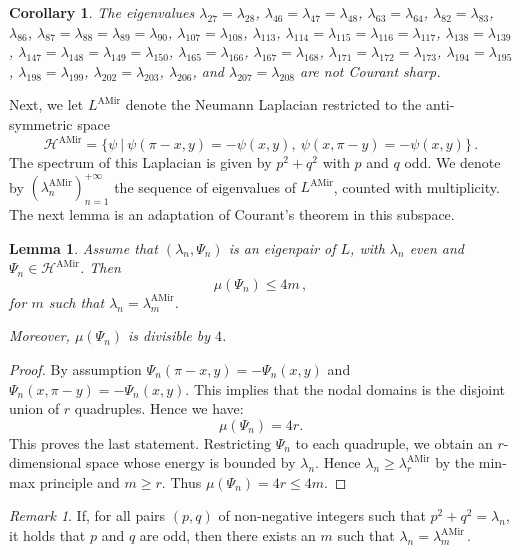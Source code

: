 \documentclass[a4paper,reqno,11pt]{amsart}
\newtheorem{lemma}[thm]{Lemma}
\newtheorem{cor}[thm]{Corollary}
\theoremstyle{remark}
\newtheorem{remark}[thm]{Remark}
\theoremstyle{definition}
\numberwithin{equation}{section}
\begin{document}
\begin{cor}
\label{cor:symmetric}
The eigenvalues 
$\lambda_{27}=\lambda_{28}$, 
$\lambda_{46}=\lambda_{47}=\lambda_{48}$, 
$\lambda_{63}=\lambda_{64}$, 
$\lambda_{82}=\lambda_{83}$, 
$\lambda_{86}$, 
$\lambda_{87}=\lambda_{88}=\lambda_{89}=\lambda_{90}$, 
$\lambda_{107}=\lambda_{108}$, 
$\lambda_{113}$, 
$\lambda_{114}=\lambda_{115}=\lambda_{116}=\lambda_{117}$, 
$\lambda_{138}=\lambda_{139}$, 
$\lambda_{147}=\lambda_{148}=\lambda_{149}=\lambda_{150}$, 
$\lambda_{165}=\lambda_{166}$, 
$\lambda_{167}=\lambda_{168}$, 
$\lambda_{171}=\lambda_{172}=\lambda_{173}$, 
$\lambda_{194}=\lambda_{195}$, 
$\lambda_{198}=\lambda_{199}$, 
$\lambda_{202}=\lambda_{203}$, 
$\lambda_{206}$, and 
$\lambda_{207}=\lambda_{208}$
are not Courant sharp.
\end{cor}

Next, we let $L^{\text{AMir}}$ denote the Neumann Laplacian restricted to the 
anti-symmetric space 
\[
\mathcal H^{\text{AMir}} = \{\psi~|~\psi(\pi-x,y)=-\psi(x,y),\ \psi(x,\pi-y)=-\psi(x,y)\}\,.
\]
The spectrum of this Laplacian is given by $p^2 + q^2$ with $p$ and $q$ odd. 
We denote by $(\lambda_n^{\text{AMir}})_{n=1}^{+\infty}$ the sequence of 
eigenvalues of $L^{\text{AMir}}$, counted with multiplicity. The next lemma is 
an adaptation of Courant's theorem in this subspace.

\begin{lemma}
\label{lem:antimirror}
Assume that $(\lambda_n,\Psi_n)$ is an eigenpair of $L$, with $\lambda_n$ even and  $\Psi_n \in \mathcal H^{\text{AMir}} $. 
Then
\[
\mu(\Psi_n) \leq 4 m\,,
\]
for $m$ such that  $\lambda_n=\lambda_m^{\text{AMir}}$.

Moreover, $\mu(\Psi_n)$ is divisible by $4$.
\end{lemma}

\begin{proof}
By assumption $\Psi_n(\pi-x,y)=-\Psi_n(x,y)$ and 
$\Psi_n(x,\pi-y)=-\Psi_n(x,y)$. This implies that the nodal domains is the 
disjoint union of $r$ quadruples. Hence we have:
\[
\mu(\Psi_n) = 4 r.
\]
This proves the last statement. Restricting $\Psi_n$ to each quadruple, we 
obtain an $r$-dimensional space whose energy is bounded by $\lambda_n$. 
Hence $\lambda_n \geq \lambda_{r}^{\text{AMir}}$ by the min-max principle and 
$m \geq  r$. Thus $\mu(\Psi_n)=4r\leq 4m$.
\end{proof}

\begin{remark}
If, for all pairs $(p,q)$ of non-negative integers such that 
$p^2+q^2=\lambda_n$, it holds that $p$ and $q$ are odd, then there exists an
$m$ such that $\lambda_n=\lambda_m^{\text{AMir}}\,$.
\end{remark}
\end{document}
